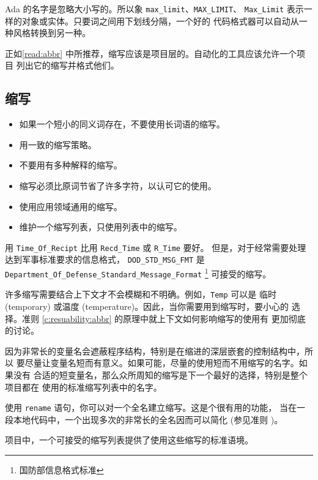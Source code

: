 \begin{blockindent}
Ada 的名字是忽略大小写的。所以象 \texttt{max\_limit}、\texttt{MAX\_LIMIT}、
\texttt{Max\_Limit} 表示一样的对象或实体。只要词之间用下划线分隔，一个好的
代码格式器可以自动从一种风格转换到另一种。

正如\ref{read:abbr} 中所推荐，缩写应该是项目层的。自动化的工具应该允许一个项目
列出它的缩写并格式他们。

\end{blockindent}

\subsection{缩写}
\label{c:readability:abbr}
\begin{itemize}
    \item 如果一个短小的同义词存在，不要使用长词语的缩写。
    \item 用一致的缩写策略。
    \item 不要用有多种解释的缩写。
    \item 缩写必须比原词节省了许多字符，以认可它的使用。
    \item 使用应用领域通用的缩写。
    \item 维护一个缩写列表，只使用列表中的缩写。
\end{itemize}

\begin{blockindent}
用 \texttt{Time\_Of\_Recipt} 比用 \texttt{Recd\_Time} 或 \texttt{R\_Time}
要好。
但是，对于经常需要处理达到军事标准要求的信息格式， \texttt{DOD\_STD\_MSG\_FMT}
是 \texttt{Department\_Of\_Defense\_Standard\_Message\_Format}
\footnote{国防部信息格式标准} 可接受的缩写。
\end{blockindent}

\begin{blockindent}
许多缩写需要结合上下文才不会模糊和不明确。例如，\texttt{Temp} 可以是
临时 (temporary) 或温度 (temperature)。因此，当你需要用到缩写时，要小心的
选择。准则 \ref{c:resuability:abbr} 的原理中就上下文如何影响缩写的使用有
更加彻底的讨论。

因为非常长的变量名会遮蔽程序结构，特别是在缩进的深层嵌套的控制结构中，所以
要尽量让变量名短而有意义。如果可能，尽量的使用短而不用缩写的名字。如果没有
合适的短变量名，那么众所周知的缩写是下一个最好的选择，特别是整个项目都在
使用的标准缩写列表中的名字。

使用 \texttt{rename} 语句，你可以对一个全名建立缩写。这是个很有用的功能，
当在一段本地代码中，一个出现多次的非常长的全名因而可以简化 (参见准则
\cite{c:pratice:rename})。

项目中，一个可接受的缩写列表提供了使用这些缩写的标准语境。
\end{blockindent}

